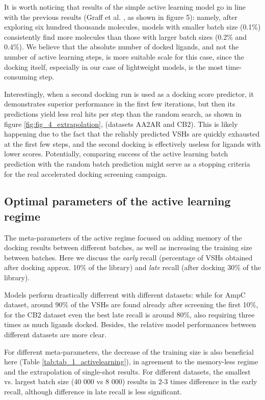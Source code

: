 It is worth noticing that results of the simple active learning model go in line with the previous results (Graff et al. \cite{Graff2021AcceleratingLearning}, as shown in figure 5): namely, after exploring six hundred thousands molecules, models with smaller batch size (0.1\%) consistently find more molecules than those with larger batch sizes (0.2\% and 0.4\%). We believe that the absolute number of docked ligands, and not the number of active learning steps, is more suitable scale for this case, since the docking itself, especially in our case of lightweight models, is the most time-consuming step.

Interestingly, when a second docking run is used as a docking score predictor, it demonstrates superior performance in the first few iterations, but then its predictions yield less real hits per step than the random search, as shown in figure \ref{fig:fig_4_extrapolation}, (datasets AA2AR and CB2). This is likely happening due to the fact that the reliably predicted VSHs are quickly exhausted at the first few steps, and the second docking is effectively useless for ligands with lower scores. Potentially, comparing success of the active learning batch prediction with the random batch prediction might serve as a stopping criteria for the real accelerated docking screening campaign.

\subsection{Optimal parameters of the active learning regime}
The meta-parameters of the active regime focused on adding memory of the docking results between different batches, as well as increasing the training size between batches. Here we discuss the \textit{early} recall (percentage of VSHs obtained after docking approx. 10\% of the library) and \textit{late} recall (after docking 30\% of the library).

Models perform drastically differrent with different datasets: while for AmpC dataset, around 90\% of the VSHs are found already after screening the first 10\%, for the CB2 dataset even the best late recall is around 80\%, also requiring three times as much ligands docked. Besides, the relative model performances between different datasets are more clear.

For different meta-parameters, the decrease of the training size is also beneficial here (Table \ref{tab:tab_1_activelearning}), in agreement to the memory-less regime and the extrapolation of single-shot results. For different datasets, the smallest vs. largest batch size (40 000 vs 8 000) results in 2-3 times difference in the early recall, although difference in late recall is less significant.

